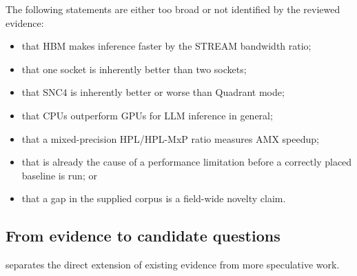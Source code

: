 The following statements are either too broad or not identified by the
reviewed evidence:

\begin{itemize}
  \item that HBM makes inference faster by the STREAM bandwidth ratio;
  \item that one socket is inherently better than two sockets;
  \item that SNC4 is inherently better or worse than Quadrant mode;
  \item that CPUs outperform GPUs for LLM inference in general;
  \item that a mixed-precision HPL/HPL-MxP ratio measures AMX speedup;
  \item that \lcpp{} is already the cause of a performance limitation
        before a correctly placed baseline is run; or
  \item that a gap in the supplied corpus is a field-wide novelty claim.
\end{itemize}

\subsection{From evidence to candidate questions}

 separates the direct extension of
existing evidence from more speculative work.

